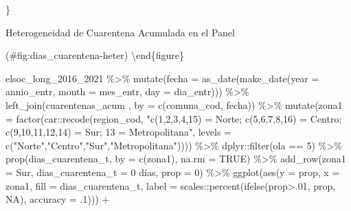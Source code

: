 \documentclass[
  12pt,
]{book}
\newenvironment{Shaded}{\begin{snugshade}}{\end{snugshade}}
\newcommand{\AttributeTok}[1]{\textcolor[rgb]{0.77,0.63,0.00}{#1}}
\newcommand{\ConstantTok}[1]{\textcolor[rgb]{0.00,0.00,0.00}{#1}}
\newcommand{\DecValTok}[1]{\textcolor[rgb]{0.00,0.00,0.81}{#1}}
\newcommand{\FunctionTok}[1]{\textcolor[rgb]{0.00,0.00,0.00}{#1}}
\newcommand{\NormalTok}[1]{#1}
\newcommand{\SpecialCharTok}[1]{\textcolor[rgb]{0.00,0.00,0.00}{#1}}
\newcommand{\StringTok}[1]{\textcolor[rgb]{0.31,0.60,0.02}{#1}}
\begin{document}
\}

\caption{Heterogeneidad de Cuarentena Acumulada en el Panel}

(\#fig:dias\_cuarentena-heter)
\textbackslash end\{figure\}

\begin{Shaded}
\begin{Highlighting}[]
\NormalTok{elsoc\_long\_2016\_2021 }\SpecialCharTok{\%\textgreater{}\%} 
  \FunctionTok{mutate}\NormalTok{(}\AttributeTok{fecha =} \FunctionTok{as\_date}\NormalTok{(}\FunctionTok{make\_date}\NormalTok{(}\AttributeTok{year =}\NormalTok{ annio\_entr, }\AttributeTok{month =}\NormalTok{ mes\_entr, }\AttributeTok{day =}\NormalTok{ dia\_entr))) }\SpecialCharTok{\%\textgreater{}\%} 
  \FunctionTok{left\_join}\NormalTok{(cuarentenas\_acum , }\AttributeTok{by =} \FunctionTok{c}\NormalTok{(}\StringTok{\textquotesingle{}comuna\_cod\textquotesingle{}}\NormalTok{, }\StringTok{\textquotesingle{}fecha\textquotesingle{}}\NormalTok{)) }\SpecialCharTok{\%\textgreater{}\%} 
  \FunctionTok{mutate}\NormalTok{(}\AttributeTok{zona1 =} \FunctionTok{factor}\NormalTok{(car}\SpecialCharTok{::}\FunctionTok{recode}\NormalTok{(region\_cod, }\StringTok{"c(1,2,3,4,15) = \textquotesingle{}Norte\textquotesingle{}; c(5,6,7,8,16) = \textquotesingle{}Centro\textquotesingle{}; c(9,10,11,12,14) = \textquotesingle{}Sur\textquotesingle{}; 13 = \textquotesingle{}Metropolitana\textquotesingle{}"}\NormalTok{, }
                                    \AttributeTok{levels =} \FunctionTok{c}\NormalTok{(}\StringTok{"Norte"}\NormalTok{,}\StringTok{"Centro"}\NormalTok{,}\StringTok{"Sur"}\NormalTok{,}\StringTok{"Metropolitana"}\NormalTok{))))  }\SpecialCharTok{\%\textgreater{}\%} 
\NormalTok{  dplyr}\SpecialCharTok{::}\FunctionTok{filter}\NormalTok{(ola }\SpecialCharTok{==} \DecValTok{5}\NormalTok{) }\SpecialCharTok{\%\textgreater{}\%}
  \FunctionTok{prop}\NormalTok{(dias\_cuarentena\_t, }\AttributeTok{by =} \FunctionTok{c}\NormalTok{(zona1), }\AttributeTok{na.rm =} \ConstantTok{TRUE}\NormalTok{) }\SpecialCharTok{\%\textgreater{}\%} 
  \FunctionTok{add\_row}\NormalTok{(}\AttributeTok{zona1 =} \StringTok{\textquotesingle{}Sur\textquotesingle{}}\NormalTok{, }\AttributeTok{dias\_cuarentena\_t =} \StringTok{\textquotesingle{}0 días\textquotesingle{}}\NormalTok{, }\AttributeTok{prop =} \DecValTok{0}\NormalTok{) }\SpecialCharTok{\%\textgreater{}\%} 
  \FunctionTok{ggplot}\NormalTok{(}\FunctionTok{aes}\NormalTok{(}\AttributeTok{y =}\NormalTok{ prop, }\AttributeTok{x =}\NormalTok{ zona1, }\AttributeTok{fill =}\NormalTok{ dias\_cuarentena\_t, }
             \AttributeTok{label =}\NormalTok{ scales}\SpecialCharTok{::}\FunctionTok{percent}\NormalTok{(}\FunctionTok{ifelse}\NormalTok{(prop}\SpecialCharTok{\textgreater{}}\NormalTok{.}\DecValTok{01}\NormalTok{, prop, }\ConstantTok{NA}\NormalTok{), }\AttributeTok{accuracy =}\NormalTok{ .}\DecValTok{1}\NormalTok{))) }\SpecialCharTok{+} 

\end{Highlighting}
\end{Shaded}
\end{document}

